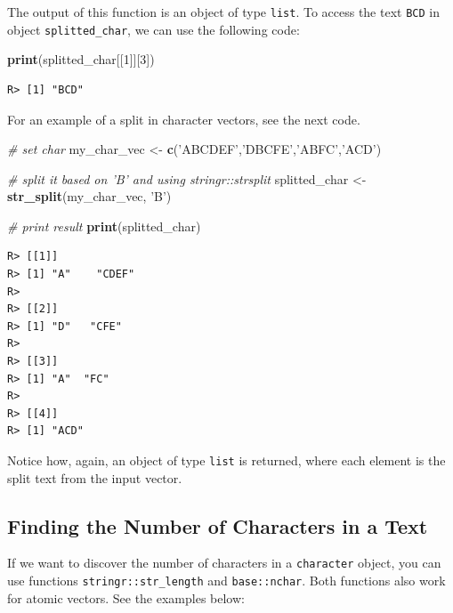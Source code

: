 \documentclass[
  12pt,
]{book}
\newenvironment{Shaded}{\begin{snugshade}}{\end{snugshade}}
\newcommand{\CommentTok}[1]{\textcolor[rgb]{0.37,0.37,0.37}{\textit{#1}}}
\newcommand{\DecValTok}[1]{\textcolor[rgb]{0.06,0.06,0.06}{#1}}
\newcommand{\KeywordTok}[1]{\textcolor[rgb]{0.27,0.27,0.27}{\textbf{#1}}}
\newcommand{\NormalTok}[1]{#1}
\newcommand{\StringTok}[1]{\textcolor[rgb]{0.5,0.5,0.5}{#1}}
\begin{document}
The output of this function is an object of type \texttt{list}. To access the text \texttt{BCD} in object \texttt{splitted\_char}, we can use the following code:

\begin{Shaded}
\begin{Highlighting}[]
\KeywordTok{print}\NormalTok{(splitted_char[[}\DecValTok{1}\NormalTok{]][}\DecValTok{3}\NormalTok{])}
\end{Highlighting}
\end{Shaded}

\begin{verbatim}
R> [1] "BCD"
\end{verbatim}

For an example of a split in character vectors, see the next code.

\begin{Shaded}
\begin{Highlighting}[]
\CommentTok{# set char}
\NormalTok{my_char_vec <-}\StringTok{ }\KeywordTok{c}\NormalTok{(}\StringTok{'ABCDEF'}\NormalTok{,}\StringTok{'DBCFE'}\NormalTok{,}\StringTok{'ABFC'}\NormalTok{,}\StringTok{'ACD'}\NormalTok{)}

\CommentTok{# split it based on 'B' and using stringr::strsplit}
\NormalTok{splitted_char <-}\StringTok{ }\KeywordTok{str_split}\NormalTok{(my_char_vec, }\StringTok{'B'}\NormalTok{)}

\CommentTok{# print result}
\KeywordTok{print}\NormalTok{(splitted_char)}
\end{Highlighting}
\end{Shaded}

\begin{verbatim}
R> [[1]]
R> [1] "A"    "CDEF"
R> 
R> [[2]]
R> [1] "D"   "CFE"
R> 
R> [[3]]
R> [1] "A"  "FC"
R> 
R> [[4]]
R> [1] "ACD"
\end{verbatim}

Notice how, again, an object of type \texttt{list} is returned, where each element is the split text from the input vector.

\hypertarget{finding-the-number-of-characters-in-a-text}{%
\subsection{Finding the Number of Characters in a Text}\label{finding-the-number-of-characters-in-a-text}}

If we want to discover the number of characters in a \texttt{character} object, you can use functions \texttt{stringr::str\_length} and \texttt{base::nchar}. Both functions also work for atomic vectors. See the examples below:  
\end{document}
